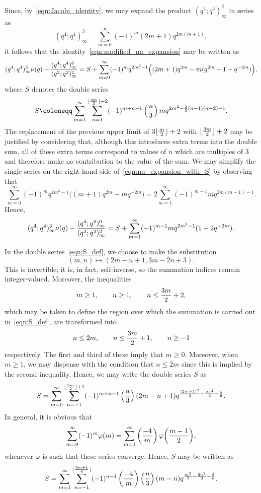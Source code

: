 \documentclass[11pt,reqno]{amsart}
\renewcommand{\=}{\;=\;}
\theoremstyle{myremark}
\begin{document}
Since, by~\eqref{eqn:Jacobi_identity}, we may expand the product $(q^4;q^4)_\infty^3$ in series as
\[ (q^4;q^4)_\infty^3 = \sum_{m=0}^\infty (-1)^m (2m+1) q^{2m(m+1)}, \]
it follows that the identity~\eqref{eqn:modified_nu_expansion} may be written as
\begin{equation} \label{eqn:nu_expansion_with_S}
(q^4;q^4)_\infty^3 \nu(q) - {(q^4;q^4)_\infty^6 \over (q^2;q^2)_\infty^2} = S + \sum_{m=0}^\infty (-1)^m q^{2m^2-1} \Big( (2m+1)q^{2m} - m(q^{2m} + 1 + q^{-2m}) \Big),
\end{equation}
where $S$ denotes the double series
\begin{equation} \label{eqn:S_def}
S \coloneqq \sum_{m=1}^\infty \sum_{n=1}^{\lfloor {3m \over 2} \rfloor + 2} (-1)^{m+n-1} \left({n \over 3} \right) m q^{2m^2-{2 \over 3}(n-1)(n-2)-1}.
\end{equation}
The replacement of the previous upper limit of $3\lfloor {m \over 2} \rfloor + 2$ with $\lfloor {3m \over 2} \rfloor + 2$ may be justified by considering that, although this introduces extra terms into the double sum, all of these extra terms correspond to values of $n$ which are multiples of $3$ and therefore make no contribution to the value of the sum. We may simplify the single series on the right-hand side of~\eqref{eqn:nu_expansion_with_S} by observing that
\[ \sum_{m=0}^\infty (-1)^m q^{2m^2-1} \Big( (m+1) q^{2m} - m q^{-2m} \Big) = 2\sum_{m=1}^\infty (-1)^{m-1} m q^{2m(m-1)-1}. \]
Hence,
\begin{equation} \label{eqn:simplified_nu_expansion_with_S}
(q^4;q^4)_\infty^3 \nu(q) - {(q^4;q^4)_\infty^6 \over (q^2;q^2)_\infty^2} = S + \sum_{m=1}^\infty (-1)^{m-1} m q^{2m^2-1} (1+2q^{-2m}).
\end{equation}

In the double series~\eqref{eqn:S_def}, we choose to make the substitution
\[ (m,n) \mapsto (2m-n+1,3m-2n+3). \]
This is invertible; it is, in fact, self-inverse, so the summation indices remain integer-valued. Moreover, the inequalities
\[ m \geq 1, \qquad n \geq 1, \qquad n \leq {3m \over 2} + 2, \]
which may be taken to define the region over which the summation is carried out in~\eqref{eqn:S_def}, are transformed into
\[ n \leq 2m, \qquad n \leq {3m \over 2} + 1, \qquad n \geq -1 \]
respectively. The first and third of these imply that $m \geq 0$. Moreover, when $m \geq 1$, we may dispense with the condition that $n \leq 2m$ since this is implied by the second inequality.
Hence, we may write the double series $S$ as
\[ S = \sum_{m=0}^\infty \sum_{n=-1}^{\lfloor{3m \over 2}\rfloor + 1} (-1)^{m+n-1} \left( {n \over 3} \right) (2m - n + 1) q^{{(2m+1)^2 \over 2} - {2n^2 \over 3} - {5 \over 6}}. \]
In general, it is obvious that
\[ \sum_{m=0}^\infty (-1)^m \varphi(m) = \sum_{m=1}^\infty \left( {-4 \over m} \right) \varphi\bigg( {m-1 \over 2} \bigg), \]
whenever $\varphi$ is such that these series converge. Hence, $S$ may be written as
\begin{equation} \label{eqn:simplified_S}
S = \sum_{m=1}^\infty \sum_{n=-1}^{\lfloor{3m+1 \over 4}\rfloor} (-1)^{n-1} \left( {-4 \over m} \right) \left( {n \over 3} \right) (m-n) q^{{m^2 \over 2} - {2n^2 \over 3} - {5 \over 6}}.
\end{equation}
\end{document}
